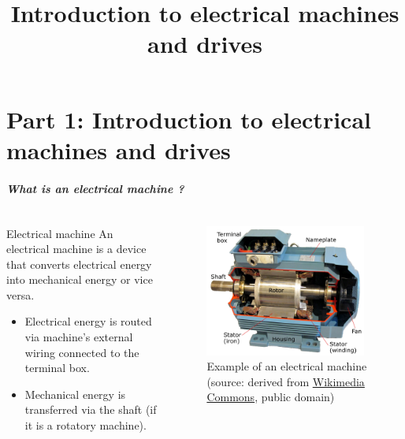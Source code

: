 \part{Part 1: Introduction to electrical machines and drives}
\title[Introduction]{Introduction to electrical machines and drives}  
\date{}  
\frame{\titlepage} 

\begin{frame}
	\frametitle{What is an electrical machine ?}
	\begin{columns}
		\begin{column}{0.5\textwidth}
			\begin{varblock}{Electrical machine}
				An electrical machine is a device that converts electrical energy into  mechanical energy or vice versa.
			\end{varblock}
			\vspace{0.25cm}
			\begin{itemize}
				\item Electrical energy is routed via machine's external wiring connected to the terminal box.
				\item Mechanical energy is transferred via the shaft (if it is a rotatory machine).
			\end{itemize}
		\end{column}
		\begin{column}{0.5\textwidth}
			\begin{figure}
				\centering
				\includegraphics[width=0.95\textwidth]{fig/lec01/Induction_machine_opened.pdf}
				\caption{Example of an electrical machine (source: derived from \href{https://commons.wikimedia.org/wiki/File:TMW_50906_Schnittmodell_einer_Drehstrommaschine_(Asynchronmaschine).jpg}{Wikimedia Commons}, public domain)}
			\end{figure}
		\end{column}
		\end{columns}
\end{frame}

